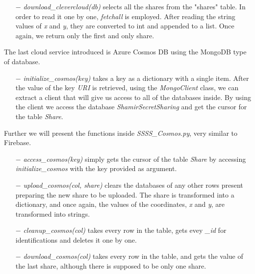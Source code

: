 \documentclass[12pt, a4paper, oneside]{book}
\begin{document}
    \vspace{-0.5cm}
    \begin{itemize}
        \item[$-$] {\it download\_clevercloud(db)} selects all the shares from the "shares" table. In order to read it one by one, {\it fetchall} is employed. After reading the string values of {\it x} and {\it y}, they are converted to int and appended to a list. Once again, we return only the first and only share.
    \end{itemize}
    
    The last cloud service introduced is Azure Cosmos DB using the MongoDB type of database.
    \begin{itemize}
        \item[$-$] {\it initialize\_cosmos(key)} takes a key as a dictionary with a single item. After the value of the key {\it URI} is retrieved, using the {\it MongoClient} class, we can extract a client that will give us access to all of the databases inside. By using the client we access the database {\it ShamirSecretSharing} and get the cursor for the table {\it Share}.
    \end{itemize}
    
    Further we will present the functions inside {\it SSSS\_Cosmos.py}, very similar to Firebase.
    \begin{itemize}
        \item[$-$] {\it access\_cosmos(key)} simply gets the cursor of the table {\it Share} by accessing {\it initialize\_cosmos} with the key provided as argument.
    \end{itemize}
    \begin{itemize}
        \item[$-$] {\it upload\_cosmos(col, share)} clears the databases of any other rows present preparing the new share to be uploaded. The share is transformed into a dictionary, and once again, the values of the coordinates, {\it x} and {\it y}, are transformed into strings.
    \end{itemize}
    \begin{itemize}
        \item[$-$] {\it cleanup\_cosmos(col)} takes every row in the table, gets evey {\it \_id} for identifications and deletes it one by one.
    \end{itemize}
    \begin{itemize}
        \item[$-$] {\it download\_cosmos(col)} takes every row in the table, and gets the value of the last share, although there is supposed to be only one share.
    \end{itemize}
    
\end{document}
